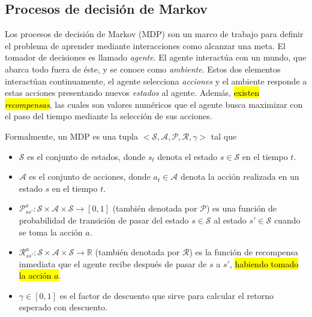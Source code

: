 \subsection{Procesos de decisión de Markov}


Los procesos de decisión de Markov (MDP) son un marco de trabajo para
definir el problema de aprender
mediante interacciones como 
alcanzar una meta. El tomador de 
decisiones es llamado \textit{agente}.
El agente interactúa con un mundo, que
abarca todo fuera de éste, y se
conoce como \textit{ambiente}.
Estos dos elementos
interactúan continuamente, el agente
selecciona \textit{acciones} y
el ambiente responde a estas 
acciones presentando nuevos 
\textit{estados} al agente. Además,
\hl{existen \textit{recompensas}},
las cuales son valores numéricos 
que el agente busca maximizar con
el paso del tiempo mediante la 
selección de sus acciones.

Formalmente, un MDP es una tupla $< \mathcal{S}, \mathcal{A}, \mathcal{P}, \mathcal{R}, \gamma>$ tal que

\begin{itemize}
    \item $\mathcal{S}$ es el conjunto de estados, donde $s_t$ denota el estado $s\in \mathcal{S}$ en el tiempo $t$.
    \item $\mathcal{A}$ es el conjunto de acciones, donde $a_t \in \mathcal{A}$
    denota la acción realizada en un estado $s$ en el tiempo $t$.
    \item $\mathcal{P}_{ss'}^{a}: \mathcal{S}\times \mathcal{A} \times \mathcal{S} \rightarrow [0, 1]$ (también denotada por $\mathcal{P}$) es una función de probabilidad de transición de pasar del estado $s \in \mathcal{S}$ al estado $s' \in \mathcal{S}$ cuando se toma la acción $a$.%
    \item $\mathcal{R}_{ss'}^{a}: \mathcal{S} \times \mathcal{A} \times \mathcal{S} \rightarrow \mathbb{R}$ (también denotada por $\mathcal{R}$) es la función de recompensa inmediata que el agente recibe después de pasar de $s$ a $s'$, \hl{habiendo tomado la acción $a$}.
    \item $\gamma \in [0,1]$ es el factor de descuento que sirve para
    calcular el retorno esperado con descuento.
\end{itemize}



